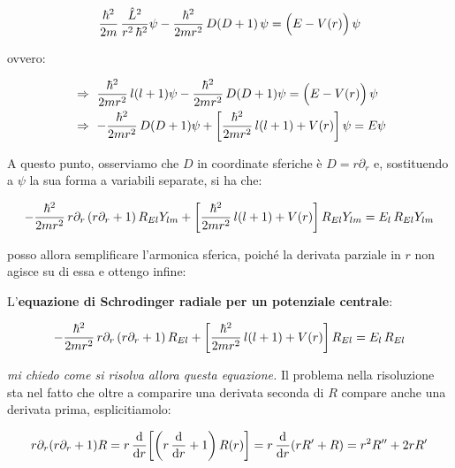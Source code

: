 \begin{align*}
	\frac{\hbar^2}{2m} \, \frac{\hat{L}^2}{r^2 \, \hbar^2} \psi - \frac{\hbar^2}{2mr^2} \, D\qty(D+1) \, \psi = \qty\Big(E - V\qty(r)) \, \psi
\end{align*}

	ovvero:
	
\begin{align*}
	& \Rightarrow \, \, \frac{\hbar^2}{2mr^2} \, l\qty( l +1) \psi - \frac{\hbar^2}{2mr^2} \, D \qty(D + 1) \psi = \qty\Big(E - V\qty(r)) \, \psi \\
	& \Rightarrow \, \, - \frac{\hbar^2}{2mr^2} \, D\qty(D +1 ) \psi + \qty[ \frac{\hbar^2}{2mr^2} \, l \qty(l + 1) + V\qty(r)  ] \, \psi = E \psi
\end{align*}

	A questo punto, osserviamo che $D$ in coordinate sferiche è $D = r \partial_r$ e, sostituendo a $\psi$ la sua forma a variabili separate, si ha che:
	
\begin{align*}
	- \frac{\hbar^2}{2mr^2} \, r \partial_r \, \qty(r \partial_r + 1) \, R_{El} Y_{lm} + \qty[  \frac{\hbar^2}{2mr^2} \, l \qty(l + 1) + V\qty(r)  ] \, R_{El} Y_{lm} = E_l \, R_{El} Y_{lm} 
\end{align*}

	posso allora semplificare l'armonica sferica, poiché la derivata parziale in $r$ non agisce su di essa e ottengo infine:
	
\begin{mydef}
	L'\textbf{equazione di Schrodinger radiale per un potenziale centrale}:
	
\begin{align*}
	- \frac{\hbar^2}{2mr^2} \, r \partial_r \, \qty(r \partial_r + 1) \, R_{El} + \qty[  \frac{\hbar^2}{2mr^2} \, l \qty(l + 1) + V\qty(r)  ] \, R_{El} = E_l \, R_{El}
\end{align*}

\end{mydef}

	\textit{mi chiedo come si risolva allora questa equazione.} Il problema nella risoluzione sta nel fatto che oltre a comparire una derivata seconda di $R$ compare anche una derivata prima, esplicitiamolo:
	
\begin{align*}
	r \partial_r \qty(r \partial_r + 1 )R = r \, \dv{r} \qty[ \qty(r \, \dv{r} + 1) \, R\qty(r)   ] = r \, \dv{r} \qty(r R' +R) = r^2 R'' + 2rR'
\end{align*}

